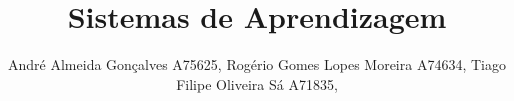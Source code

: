 \title{Sistemas de Aprendizagem}

\author{
André Almeida Gonçalves A75625,
Rogério Gomes Lopes Moreira A74634,
Tiago Filipe Oliveira Sá A71835,}

\maketitle